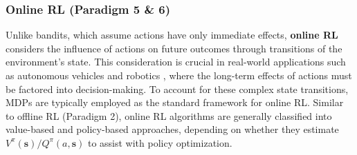 


\subsubsection{Online \acrlong{RL} (Paradigm 5 \& 6)} \label{sec:RL_optimization}
Unlike bandits, which assume actions have only immediate effects, \textbf{online \acrlong{RL}} \citep{sutton2018reinforcement} considers the influence of actions on future outcomes through transitions of the environment's state. This consideration is crucial in real-world applications such as autonomous vehicles \citep{kiran2021deep} and robotics \citep{singh2022reinforcement}, where the long-term effects of actions must be factored into decision-making. To account for these complex state transitions, \acrshort{MDP}s are typically employed as the standard framework for online \acrshort{RL}. Similar to offline \acrshort{RL} (Paradigm 2), online \acrshort{RL} algorithms are generally classified into value-based and policy-based approaches, depending on whether they estimate $V^{\pi}(\boldsymbol{s})/Q^{\pi}(a,\boldsymbol{s})$ to assist with policy optimization.


